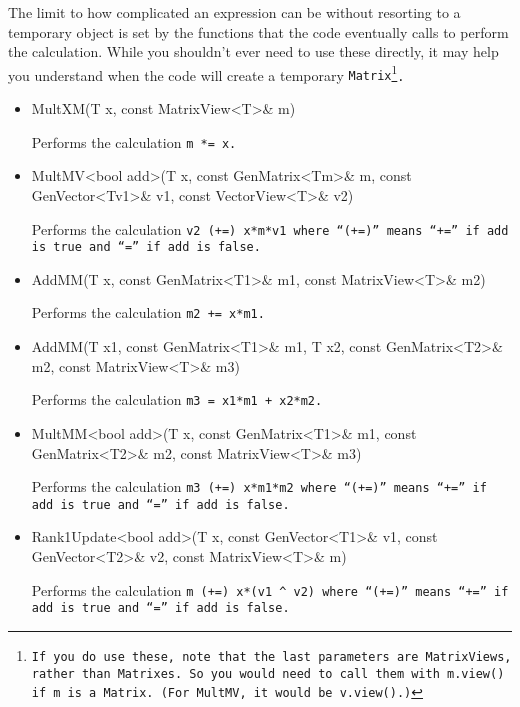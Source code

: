 The limit to how complicated an expression can be without resorting to a temporary object
is set by the 
functions that the code eventually calls to perform the calculation.  
While you shouldn't ever
need to use these directly, it may help you understand when the code will create a
temporary \tt{Matrix}\footnote{If you do use these, note that the last parameters are
\tt{MatrixView}s, rather than \tt{Matrix}es.  So you would need to 
call them with \tt{m.view()} if \tt{m} is a \tt{Matrix}.  (For \tt{MultMV},
it would be \tt{v.view()}.)}.

\begin{itemize}

\item
\begin{tmvcode}
MultXM(T x, const MatrixView<T>& m)
\end{tmvcode}
Performs the calculation \tt{m *= x}.

\item
\begin{tmvcode}
MultMV<bool add>(T x, const GenMatrix<Tm>& m, 
      const GenVector<Tv1>& v1, const VectorView<T>& v2)
\end{tmvcode}
Performs the calculation \tt{v2 (+=) x*m*v1} 
where ``\tt{(+=)}'' means ``\tt{+=}'' 
if \tt{add} is true and ``\tt{=}'' if \tt{add} is false.

\item
\begin{tmvcode}
AddMM(T x, const GenMatrix<T1>& m1, const MatrixView<T>& m2)
\end{tmvcode}
Performs the calculation \tt{m2 += x*m1}.

\item
\begin{tmvcode}
AddMM(T x1, const GenMatrix<T1>& m1, T x2, const GenMatrix<T2>& m2,
      const MatrixView<T>& m3)
\end{tmvcode}
Performs the calculation \tt{m3 = x1*m1 + x2*m2}.

\item
\begin{tmvcode}
MultMM<bool add>(T x, const GenMatrix<T1>& m1, 
      const GenMatrix<T2>& m2, const MatrixView<T>& m3)
\end{tmvcode}
Performs the calculation \tt{m3 (+=) x*m1*m2} 
where ``\tt{(+=)}'' means ``\tt{+=}'' 
if \tt{add} is true and ``\tt{=}'' if \tt{add} is false.

\item
\begin{tmvcode}
Rank1Update<bool add>(T x, const GenVector<T1>& v1, 
      const GenVector<T2>& v2, const MatrixView<T>& m)
\end{tmvcode}
Performs the calculation 
\tt{m (+=) x*(v1 ^ v2)} 
where ``\tt{(+=)}'' means ``\tt{+=}'' 
if \tt{add} is true and ``\tt{=}'' if \tt{add} is false.

\end{itemize}

